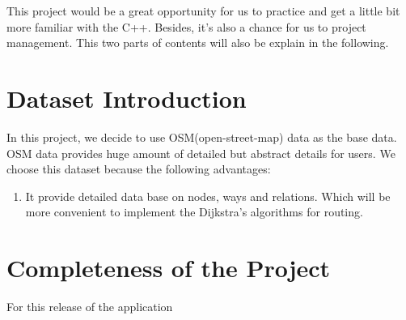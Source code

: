 \documentclass[a4paper, 12pt, english]{book}
\begin{document}
This project would be a great opportunity for us to practice and get a little bit more familiar with the C++. Besides, it's also a chance for us to project management. This two parts of contents will also be explain in the following.



\section{Dataset Introduction}

In this project, we decide to use OSM(open-street-map) data as the base data. OSM data provides huge amount of detailed but abstract details for users. We choose this dataset because the following advantages:

\begin{enumerate}
	\item  It provide detailed data base on nodes, ways and relations. Which will be more convenient to implement the Dijkstra's algorithms for routing.
\end{enumerate}

\section{Completeness of the Project}

For this release of the application
\end{document}
